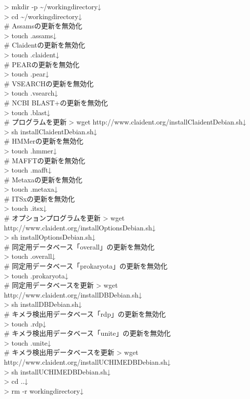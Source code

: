 \documentclass[titlepage,10pt,a4paper]{jsbook}
\newenvironment{cmd}{\begin{oframed}\raggedright\ttfamily\footnotesize\setlength{\baselineskip}{1.4em}}{\end{oframed}\vspace{-1em}}
\begin{document}
\begin{cmd}
{\textgreater} mkdir -p {\textasciitilde}/workingdirectory↓\\
{\textgreater} cd {\textasciitilde}/workingdirectory↓\\
\# Assamsの更新を無効化\\
{\textgreater} touch .assams↓\\
\# Claidentの更新を無効化\\
{\textgreater} touch .claident↓\\
\# PEARの更新を無効化\\
{\textgreater} touch .pear↓\\
\# VSEARCHの更新を無効化\\
{\textgreater} touch .vsearch↓\\
\# NCBI BLAST+の更新を無効化\\
{\textgreater} touch .blast↓\\
\# プログラムを更新
{\textgreater} wget http://www.claident.org/installClaident{\textunderscore}Debian.sh↓\\
{\textgreater} sh installClaident{\textunderscore}Debian.sh↓\\
\# HMMerの更新を無効化\\
{\textgreater} touch .hmmer↓\\
\# MAFFTの更新を無効化\\
{\textgreater} touch .mafft↓\\
\# Metaxaの更新を無効化\\
{\textgreater} touch .metaxa↓\\
\# ITSxの更新を無効化\\
{\textgreater} touch .itsx↓\\
\# オプションプログラムを更新
{\textgreater} wget http://www.claident.org/installOptions{\textunderscore}Debian.sh↓\\
{\textgreater} sh installOptions{\textunderscore}Debian.sh↓\\
\# 同定用データベース「overall」の更新を無効化\\
{\textgreater} touch .overall↓\\
\# 同定用データベース「prokaryota」の更新を無効化\\
{\textgreater} touch .prokaryota↓\\
\# 同定用データベースを更新
{\textgreater} wget http://www.claident.org/installDB{\textunderscore}Debian.sh↓\\
{\textgreater} sh installDB{\textunderscore}Debian.sh↓\\
\# キメラ検出用データベース「rdp」の更新を無効化\\
{\textgreater} touch .rdp↓\\
\# キメラ検出用データベース「unite」の更新を無効化\\
{\textgreater} touch .unite↓\\
\# キメラ検出用データベースを更新
{\textgreater} wget http://www.claident.org/installUCHIMEDB{\textunderscore}Debian.sh↓\\
{\textgreater} sh installUCHIMEDB{\textunderscore}Debian.sh↓\\
{\textgreater} cd ..↓\\
{\textgreater} rm -r workingdirectory↓
\end{cmd}
\end{document}
